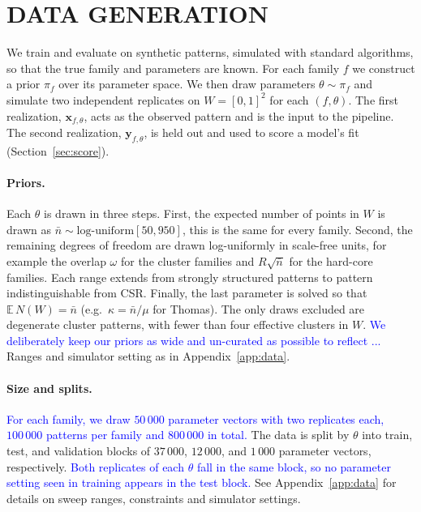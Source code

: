 \documentclass[twoside]{article}
\newcommand{\review}[1]{\textcolor{blue}{#1}}
\newcommand{\nb}{\bar n}
\newcommand{\pc}{\mathbf{x}}
\newcommand{\rc}{\mathbf{y}}
\begin{document}

\section{DATA GENERATION}
\label{sec:data}

We train and evaluate on synthetic patterns, simulated with standard algorithms, so that the true family and parameters are known. For each family $f$ we construct a prior $\pi_f$ over its parameter space. We then draw parameters $\theta\sim\pi_f$ and simulate two independent replicates on $W = [0, 1]^2$ for each $(f, \theta)$. The first realization, $\pc_{f, \theta}$, acts as the observed pattern and is the input to the pipeline. The second realization, $\rc_{f, \theta}$, is held out and used to score a model's fit (Section~\ref{sec:score}).

\paragraph{Priors.} Each $\theta$ is drawn in three steps. First, the expected number of points in $W$ is drawn as $\nb\sim\text{log-uniform}[50,950]$, this is the same for every family. Second, the remaining degrees of freedom are drawn log-uniformly in scale-free units, for example the overlap $\omega$ for the cluster families and $R\sqrt{\nb}$ for the hard-core families. Each range extends from strongly structured patterns to pattern indistinguishable from CSR. Finally, the last parameter is solved so that  $\mathbb{E}\,N(W)=\nb$ (e.g.\ $\kappa=\nb/\mu$ for Thomas). The only draws excluded are degenerate cluster patterns, with fewer than four effective clusters in $W$. \review{We deliberately keep our priors as wide and un-curated as possible to reflect ...} Ranges and simulator setting as in Appendix~\ref{app:data}.

\paragraph{Size and splits.}
\review{For each family, we draw $50\,000$ parameter vectors with two replicates each, $100\,000$ patterns per family and $800\,000$ in total.} The data is split by $\theta$ into train, test, and validation blocks of $37\,000$, $12\,000$, and $1\,000$ parameter vectors, respectively. \review{Both replicates of each $\theta$ fall in the same block, so no parameter setting seen in training appears in the test block.} See Appendix~\ref{app:data} for details on sweep ranges, constraints and simulator settings.
\end{document}
